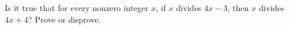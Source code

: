 Is it true that for every nonzero integer $x$, if $x$ divides $4x-3$, then $x$ divides $4x+4$? Prove or disprove.
